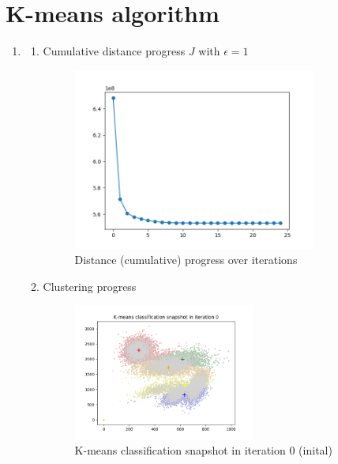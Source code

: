 \documentclass[12pt,a4paper]{article}
\begin{document}
\section{K-means algorithm}

\begin{enumerate}[start=2,label*={\arabic*.}]

  \item
  \begin{enumerate}
	  \item Cumulative distance progress $J$ with $\epsilon = 1$

\begin{figure}[H]
  \centering
  \includegraphics[width=0.8\textwidth]{figures/2_0_distance.png}
	\caption{Distance (cumulative) progress over iterations}
	\label{2_0_distance}
\end{figure}

	  \item Clustering progress
	  
\begin{figure}[H]
  \centering
  \includegraphics[width=0.6\textwidth]{figures/kmcl_0.png}
	\caption{K-means classification snapshot in iteration 0 (inital)}
	\label{kmcl_0}
\end{figure}


\end{enumerate}
\end{enumerate}
\end{document}
